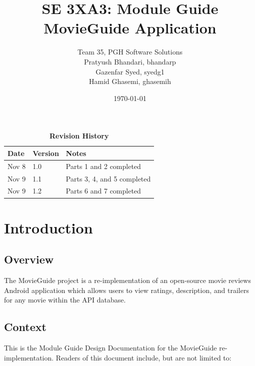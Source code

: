\documentclass[12pt, titlepage]{article}
\title{SE 3XA3: Module Guide\\MovieGuide Application}
\author{Team 35, PGH Software Solutions
		\\ Pratyush Bhandari, bhandarp
		\\ Gazenfar Syed, syedg1
		\\ Hamid Ghasemi, ghasemih
}
\date{\today}
\begin{document}
\maketitle

\tableofcontents

\newpage

\listoftables
\listoffigures

\begin{table}[bp]
\caption{\bf Revision History}
\begin{tabularx}{\textwidth}{p{3cm}p{2cm}X}
\toprule {\bf Date} & {\bf Version} & {\bf Notes}\\
\midrule
Nov 8 & 1.0 & Parts 1 and 2 completed\\
Nov 9 & 1.1 & Parts 3, 4, and 5 completed\\
Nov 9 & 1.2 & Parts 6 and 7 completed\\
\bottomrule
\end{tabularx}
\end{table}


 
\newpage
\section{Introduction}

\subsection{Overview}
The MovieGuide project is a re-implementation of an open-source movie reviews Android application which allows users to view ratings, description, and trailers for any movie within the API database.

\subsection{Context}
This is the Module Guide Design Documentation for the MovieGuide re-implementation. Readers of this document include, but are not limited to:
\end{document}
